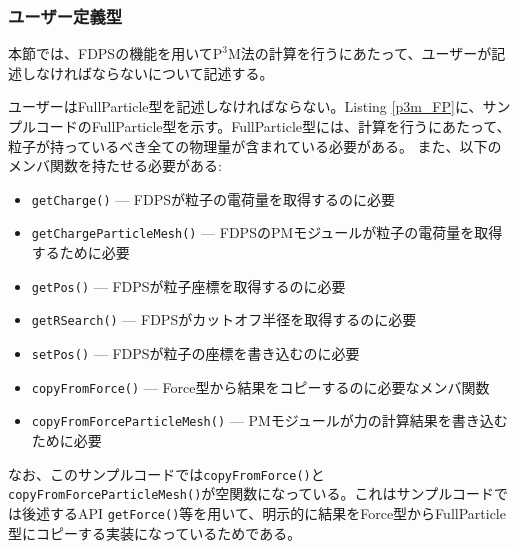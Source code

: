 \subsubsection{ユーザー定義型}
本節では、FDPSの機能を用いて$\mathrm{P^{3}M}$法の計算を行うにあたって、ユーザーが記述しなければならない\structure について記述する。

ユーザーはFullParticle型を記述しなければならない。Listing \ref{p3m_FP}に、サンプルコードのFullParticle型を示す。FullParticle型には、計算を行うにあたって、粒子が持っているべき全ての物理量が含まれている必要がある。
\ifCpp %
また、以下のメンバ関数を持たせる必要がある:
\begin{itemize}[leftmargin=*,itemsep=-1ex]
\item \texttt{getCharge()} --- FDPSが粒子の電荷量を取得するのに必要
\item \texttt{getChargeParticleMesh()} --- FDPSのPMモジュールが粒子の電荷量を取得するために必要
\item \texttt{getPos()} --- FDPSが粒子座標を取得するのに必要
\item \texttt{getRSearch()} --- FDPSがカットオフ半径を取得するのに必要
\item \texttt{setPos()} --- FDPSが粒子の座標を書き込むのに必要
\item \texttt{copyFromForce()} --- Force型から結果をコピーするのに必要なメンバ関数
\item \texttt{copyFromForceParticleMesh()} --- PMモジュールが力の計算結果を書き込むために必要
\end{itemize}
なお、このサンプルコードでは\texttt{copyFromForce()}と\texttt{copyFromForceParticleMesh()}が空関数になっている。これはサンプルコードでは後述するAPI \texttt{getForce()}等を用いて、明示的に結果をForce型からFullParticle型にコピーする実装になっているためである。
\endifCpp

\ifCpp %

\endifCpp
\ifFtn %

\endifFtn
\ifC %

\endifC

